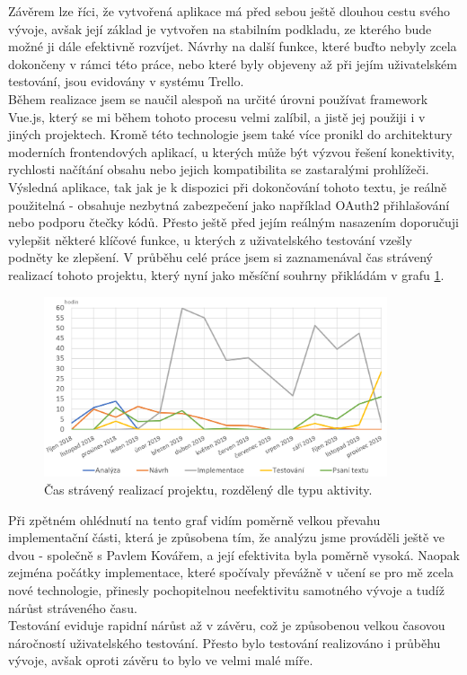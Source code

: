 \begin{conclusion} \label{conclusion}

Závěrem lze říci, že vytvořená aplikace má před sebou ještě dlouhou cestu svého vývoje, avšak její základ je vytvořen na stabilním podkladu, ze kterého bude možné ji dále efektivně rozvíjet. Návrhy na další funkce, které buďto nebyly zcela dokončeny v rámci této práce, nebo které byly objeveny až při jejím uživatelském testování, jsou evidovány v systému Trello.\\
Během realizace jsem se naučil alespoň na určité úrovni používat framework Vue.js, který se mi během tohoto procesu velmi zalíbil, a jistě jej použiji i v jiných projektech. Kromě této technologie jsem také více pronikl do architektury moderních frontendových aplikací, u kterých může být výzvou řešení konektivity, rychlosti načítání obsahu nebo jejich kompatibilita se zastaralými prohlížeči.\\
Výsledná aplikace, tak jak je k dispozici při dokončování tohoto textu, je reálně použitelná - obsahuje nezbytná zabezpečení jako například OAuth2 přihlašování nebo podporu čtečky kódů. Přesto ještě před jejím reálným nasazením doporučuji vylepšit některé klíčové funkce, u kterých z uživatelského testování vzešly podněty ke zlepšení.
V průběhu celé práce jsem si zaznamenával čas strávený realizací tohoto projektu, který nyní jako měsíční souhrny přikládám v grafu \ref{picture:time:spent}.

\begin{figure}[H]
\includegraphics[width=0.9\textwidth]{../png/time/time_spent.png}
\caption[Měsíční čas strávený realizací projektu]{Čas strávený realizací projektu, rozdělený dle typu aktivity.} \label{picture:time:spent}
\end{figure}

Při zpětném ohlédnutí na tento graf vidím poměrně velkou převahu implementační části, která je způsobena tím, že analýzu jsme prováděli ještě ve dvou - společně s Pavlem Kovářem, a její efektivita byla poměrně vysoká. Naopak zejména počátky implementace, které spočívaly převážně v učení se pro mě zcela nové technologie, přinesly pochopitelnou neefektivitu samotného vývoje a tudíž nárůst stráveného času.\\
Testování eviduje rapidní nárůst až v závěru, což je způsobenou velkou časovou náročností uživatelského testování. Přesto bylo testování realizováno i průběhu vývoje, avšak oproti závěru to bylo ve velmi malé míře.\\

\end{conclusion}
